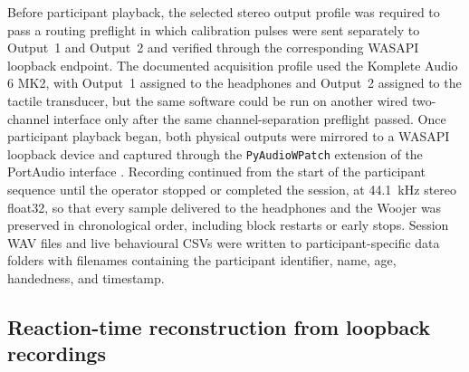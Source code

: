 Before participant playback, the selected stereo output profile was required to pass a routing preflight in which calibration pulses were sent separately to Output~1 and Output~2 and verified through the corresponding WASAPI loopback endpoint. The documented acquisition profile used the Komplete Audio 6 MK2, with Output~1 assigned to the headphones and Output~2 assigned to the tactile transducer, but the same software could be run on another wired two-channel interface only after the same channel-separation preflight passed. Once participant playback began, both physical outputs were mirrored to a WASAPI loopback device and captured through the \texttt{PyAudioWPatch} extension of the PortAudio interface \citep{pyaudiowpatch}. Recording continued from the start of the participant sequence until the operator stopped or completed the session, at 44.1~kHz stereo float32, so that every sample delivered to the headphones and the Woojer was preserved in chronological order, including block restarts or early stops. Session WAV files and live behavioural CSVs were written to participant-specific data folders with filenames containing the participant identifier, name, age, handedness, and timestamp.

\subsection{Reaction-time reconstruction from loopback recordings}

